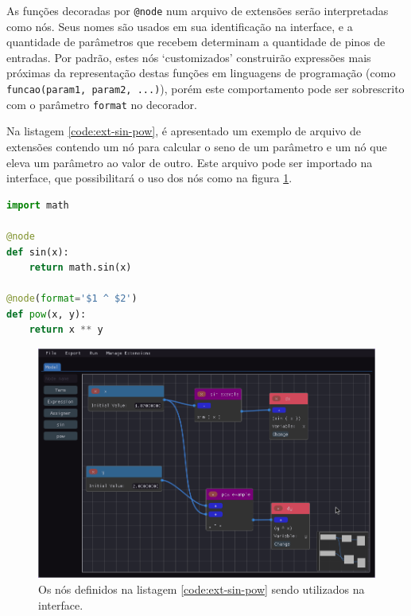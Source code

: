 \documentclass[
	12pt,				%
	openright,			%
	oneside,			%
	a4paper,			%
	main=brazil,
	english,			%
	]{ufsj-abntex2}
\begin{document}
As funções decoradas por \texttt{@node} num arquivo de extensões serão interpretadas como nós. Seus nomes são usados em sua identificação na interface, e a quantidade de parâmetros que recebem determinam a quantidade de pinos de entradas. Por padrão, estes nós `customizados' construirão expressões mais próximas da representação destas funções em linguagens de programação (como \texttt{funcao(param1, param2, ...)}), porém este comportamento pode ser sobrescrito com o parâmetro \texttt{format} no decorador.

Na listagem \ref{code:ext-sin-pow}, é apresentado um exemplo de arquivo de extensões contendo um nó para calcular o seno de um parâmetro e um nó que eleva um parâmetro ao valor de outro. Este arquivo pode ser importado na interface, que possibilitará o uso dos nós como na figura \ref{fig:ext-sin-pow}.

\begin{lstlisting}[language=Python, label=code:ext-sin-pow, caption=Exemplo de definição dos nós de extensão seno e potência com código Python válido., float, xleftmargin=.35\textwidth]
import math

@node
def sin(x):
    return math.sin(x)

@node(format='$1 ^ $2')
def pow(x, y):
    return x ** y

\end{lstlisting}

\begin{figure}[h]
    \centering
    \includegraphics[scale=0.45]{imgs/ode-designer/ext-sin-pow.png} 
    \caption{Os nós definidos na listagem \ref{code:ext-sin-pow} sendo utilizados na interface.}
    \label{fig:ext-sin-pow}
\end{figure}
\end{document}
